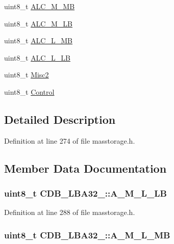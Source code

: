 \begin{DoxyCompactItemize}
uint8\-\_\-t \hyperlink{struct_c_d_b___l_b_a32__16_ab03ff411de8da944cbaba39bd33ae7bc}{\-A\-L\-C\-\_\-\-M\-\_\-\-M\-B}
\item 
uint8\-\_\-t \hyperlink{struct_c_d_b___l_b_a32__16_a57fc0fb5cba1f737be25721e7f34f11f}{\-A\-L\-C\-\_\-\-M\-\_\-\-L\-B}
\item 
uint8\-\_\-t \hyperlink{struct_c_d_b___l_b_a32__16_afc2671b54d66b5b06fba9a73c2c4cad9}{\-A\-L\-C\-\_\-\-L\-\_\-\-M\-B}
\item 
uint8\-\_\-t \hyperlink{struct_c_d_b___l_b_a32__16_a03d583e8bd99b2d196d734ffd0951fff}{\-A\-L\-C\-\_\-\-L\-\_\-\-L\-B}
\item 
uint8\-\_\-t \hyperlink{struct_c_d_b___l_b_a32__16_a3809ba2a5399bd407b50b04b8c83cb9f}{\-Misc2}
\item 
uint8\-\_\-t \hyperlink{struct_c_d_b___l_b_a32__16_aed4424e6a3afd515084359084a5e8fcb}{\-Control}
\end{DoxyCompactItemize}


\subsection{\-Detailed \-Description}


\-Definition at line 274 of file masstorage.\-h.



\subsection{\-Member \-Data \-Documentation}
\hypertarget{struct_c_d_b___l_b_a32__16_a636ad8867ce15eb200e30fe1002f3df2}{
\subsubsection[{\-A\-\_\-\-M\-\_\-\-L\-\_\-\-L\-B}]{\setlength{\rightskip}{0pt plus 5cm}uint8\-\_\-t {\bf \-C\-D\-B\-\_\-\-L\-B\-A32\-\_\-::\-A\-\_\-\-M\-\_\-\-L\-\_\-\-L\-B}}}\label{struct_c_d_b___l_b_a32__16_a636ad8867ce15eb200e30fe1002f3df2}


\-Definition at line 288 of file masstorage.\-h.

\hypertarget{struct_c_d_b___l_b_a32__16_a104deb61d8c0973b5140fd8f586df4e9}{
\subsubsection[{\-A\-\_\-\-M\-\_\-\-L\-\_\-\-M\-B}]{\setlength{\rightskip}{0pt plus 5cm}uint8\-\_\-t {\bf \-C\-D\-B\-\_\-\-L\-B\-A32\-\_\-::\-A\-\_\-\-M\-\_\-\-L\-\_\-\-M\-B}}}\label{struct_c_d_b___l_b_a32__16_a104deb61d8c0973b5140fd8f586df4e9}


